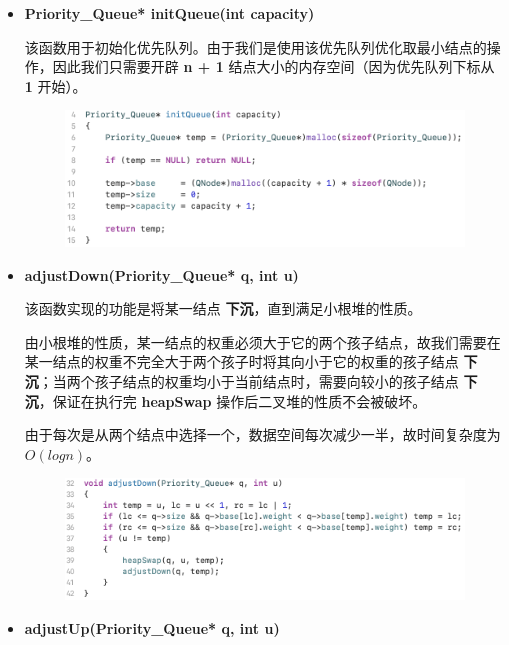             \begin{itemize}
                \item \textbf{Priority\_Queue* initQueue(int capacity)}
                    \par 该函数用于初始化优先队列。由于我们是使用该优先队列优化取最小结点的操作，因此我们只需要开辟 \textbf{n + 1} 结点大小的内存空间（因为优先队列下标从 \textbf{1} 开始）。
                    \begin{figure}[htbp]
                        \hspace*{1.2cm}
                        \includegraphics*[width = 13cm]{s2_0.png}
                    \end{figure}
                \item \textbf{adjustDown(Priority\_Queue* q, int u)}
                    \par 该函数实现的功能是将某一结点 \textbf{下沉}，直到满足小根堆的性质。
                    \par 由小根堆的性质，某一结点的权重必须大于它的两个孩子结点，故我们需要在某一结点的权重不完全大于两个孩子时将其向小于它的权重的孩子结点 \textbf{下沉}；当两个孩子结点的权重均小于当前结点时，需要向较小的孩子结点 \textbf{下沉}，保证在执行完 \textbf{heapSwap} 操作后二叉堆的性质不会被破坏。
                    \par 由于每次是从两个结点中选择一个，数据空间每次减少一半，故时间复杂度为 $O(logn)$。
                    \begin{figure}[htbp]
                        \hspace*{1.2cm}
                        \includegraphics*[width = 12cm]{s2_1.png}
                    \end{figure}
                \item \textbf{adjustUp(Priority\_Queue* q, int u)}

\end{itemize}
